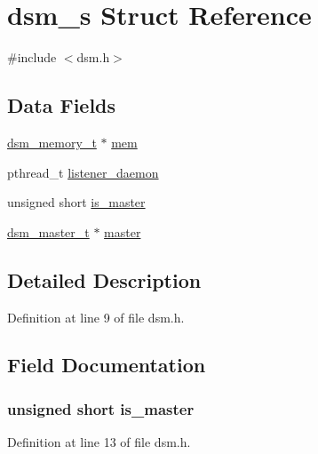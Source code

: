 \hypertarget{structdsm__s}{}\section{dsm\+\_\+s Struct Reference}
\label{structdsm__s}


{\ttfamily \#include $<$dsm.\+h$>$}

\subsection*{Data Fields}
\begin{DoxyCompactItemize}
\item 
\hyperlink{dsm__memory_8h_a81f92df24b2df85528fc0fd092073bd9}{dsm\+\_\+memory\+\_\+t} $\ast$ \hyperlink{structdsm__s_aae25464acfd352563246c0194a8f590e}{mem}
\item 
pthread\+\_\+t \hyperlink{structdsm__s_a4977415cf5a2a53116bbc29834d4f216}{listener\+\_\+daemon}
\item 
unsigned short \hyperlink{structdsm__s_a7a007f8ca8c011fa11f28ad1159bd797}{is\+\_\+master}
\item 
\hyperlink{dsm__master_8h_a526b8591ca42ce91c533a931cff83473}{dsm\+\_\+master\+\_\+t} $\ast$ \hyperlink{structdsm__s_a3de7fd7c308a2411b942e0236fd5bb83}{master}
\end{DoxyCompactItemize}


\subsection{Detailed Description}


Definition at line 9 of file dsm.\+h.



\subsection{Field Documentation}
\subsubsection[{\texorpdfstring{is\+\_\+master}{is_master}}]{\setlength{\rightskip}{0pt plus 5cm}unsigned short is\+\_\+master}\hypertarget{structdsm__s_a7a007f8ca8c011fa11f28ad1159bd797}{}\label{structdsm__s_a7a007f8ca8c011fa11f28ad1159bd797}


Definition at line 13 of file dsm.\+h.


